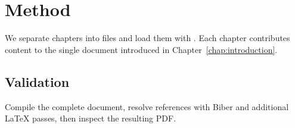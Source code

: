 \chapter{Method}
\label{chap:method}
We separate chapters into files and load them with \verb||.
Each chapter contributes content to the single document introduced
in Chapter~\ref{chap:introduction}.

\section{Validation}
Compile the complete document, resolve references with Biber and
additional LaTeX passes, then inspect the resulting PDF.
